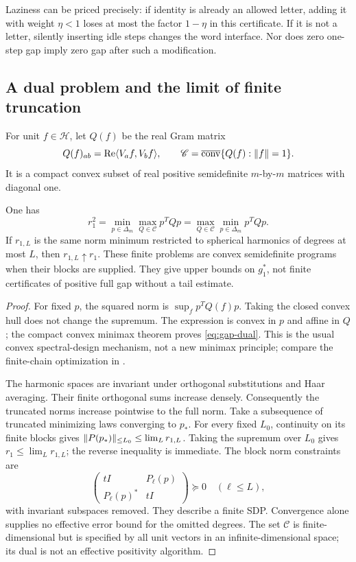 Laziness can be priced precisely: if identity is already an allowed letter, adding it with weight $\eta<1$ loses at most the factor $1-\eta$ in this certificate. If it is not a letter, silently inserting idle steps changes the word interface. Nor does zero one-step gap imply zero gap after such a modification.

\subsection{A dual problem and the limit of finite truncation}
For unit $f\in\mathcal H$, let $Q(f)$ be the real Gram matrix
\[
 Q(f)_{ab}=\operatorname{Re}\langle V_af,V_bf\rangle,
 \qquad \mathscr C=\overline{\operatorname{conv}}\{Q(f):\lVert f\rVert=1\}.
\]
It is a compact convex subset of real positive semidefinite $m$-by-$m$ matrices with diagonal one.
\begin{proposition}\label{prop:gap-dual}
One has
\begin{equation}\label{eq:gap-dual}
 r_1^2=\min_{p\in\Delta_m}\max_{Q\in\mathscr C}p^TQp
      =\max_{Q\in\mathscr C}\min_{p\in\Delta_m}p^TQp.
\end{equation}
If $r_{1,L}$ is the same norm minimum restricted to spherical harmonics of degrees at most $L$, then $r_{1,L}\uparrow r_1$. These finite problems are convex semidefinite programs when their blocks are supplied. They give upper bounds on $g_1^*$, not finite certificates of positive full gap without a tail estimate.
\end{proposition}
\begin{proof}
For fixed $p$, the squared norm is $\sup_f p^TQ(f)p$. Taking the closed convex hull does not change the supremum. The expression is convex in $p$ and affine in $Q$; the compact convex minimax theorem proves \eqref{eq:gap-dual}. This is the usual convex spectral-design mechanism, not a new minimax principle; compare the finite-chain optimization in \cite{BDX}.

The harmonic spaces are invariant under orthogonal substitutions and Haar averaging. Their finite orthogonal sums increase densely. Consequently the truncated norms increase pointwise to the full norm. Take a subsequence of truncated minimizing laws converging to $p_*$. For every fixed $L_0$, continuity on its finite blocks gives $\lVert P(p_*)\rVert_{\le L_0}\le\lim_L r_{1,L}$. Taking the supremum over $L_0$ gives $r_1\le\lim_L r_{1,L}$; the reverse inequality is immediate. The block norm constraints are
\[
 \begin{pmatrix}tI&P_\ell(p)\\P_\ell(p)^*&tI\end{pmatrix}\succeq0
 \quad(\ell\le L),
\]
with invariant subspaces removed. They describe a finite SDP. Convergence alone supplies no effective error bound for the omitted degrees. The set $\mathscr C$ is finite-dimensional but is specified by all unit vectors in an infinite-dimensional space; its dual is not an effective positivity algorithm.
\end{proof}

